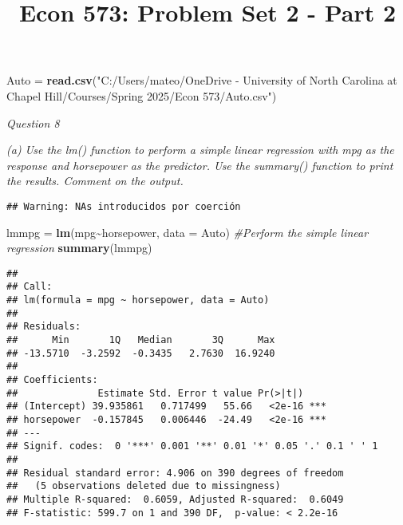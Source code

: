 \documentclass[
]{article}
\title{Econ 573: Problem Set 2 - Part 2}
\author{}
\date{\vspace{-2.5em}}
\newenvironment{Shaded}{\begin{snugshade}}{\end{snugshade}}
\newcommand{\AttributeTok}[1]{\textcolor[rgb]{0.13,0.29,0.53}{#1}}
\newcommand{\CommentTok}[1]{\textcolor[rgb]{0.56,0.35,0.01}{\textit{#1}}}
\newcommand{\FunctionTok}[1]{\textcolor[rgb]{0.13,0.29,0.53}{\textbf{#1}}}
\newcommand{\NormalTok}[1]{#1}
\newcommand{\OtherTok}[1]{\textcolor[rgb]{0.56,0.35,0.01}{#1}}
\newcommand{\SpecialCharTok}[1]{\textcolor[rgb]{0.81,0.36,0.00}{\textbf{#1}}}
\newcommand{\StringTok}[1]{\textcolor[rgb]{0.31,0.60,0.02}{#1}}
\begin{document}
\maketitle

\begin{Shaded}
\begin{Highlighting}[]
\NormalTok{Auto }\OtherTok{=} \FunctionTok{read.csv}\NormalTok{(}\StringTok{"C:/Users/mateo/OneDrive {-} University of North Carolina at Chapel Hill/Courses/Spring 2025/Econ 573/Auto.csv"}\NormalTok{)}
\end{Highlighting}
\end{Shaded}

\emph{Question 8}

\emph{(a) Use the lm() function to perform a simple linear regression
with mpg as the response and horsepower as the predictor. Use the
summary() function to print the results. Comment on the output.}

\begin{Shaded}
\end{Shaded}

\begin{verbatim}
## Warning: NAs introducidos por coerción
\end{verbatim}

\begin{Shaded}
\begin{Highlighting}[]
\NormalTok{lmmpg }\OtherTok{=} \FunctionTok{lm}\NormalTok{(mpg}\SpecialCharTok{\textasciitilde{}}\NormalTok{horsepower, }\AttributeTok{data =}\NormalTok{ Auto) }\CommentTok{\#Perform the simple linear regression}
\FunctionTok{summary}\NormalTok{(lmmpg)}
\end{Highlighting}
\end{Shaded}

\begin{verbatim}
## 
## Call:
## lm(formula = mpg ~ horsepower, data = Auto)
## 
## Residuals:
##      Min       1Q   Median       3Q      Max 
## -13.5710  -3.2592  -0.3435   2.7630  16.9240 
## 
## Coefficients:
##              Estimate Std. Error t value Pr(>|t|)    
## (Intercept) 39.935861   0.717499   55.66   <2e-16 ***
## horsepower  -0.157845   0.006446  -24.49   <2e-16 ***
## ---
## Signif. codes:  0 '***' 0.001 '**' 0.01 '*' 0.05 '.' 0.1 ' ' 1
## 
## Residual standard error: 4.906 on 390 degrees of freedom
##   (5 observations deleted due to missingness)
## Multiple R-squared:  0.6059, Adjusted R-squared:  0.6049 
## F-statistic: 599.7 on 1 and 390 DF,  p-value: < 2.2e-16
\end{verbatim}
\end{document}
